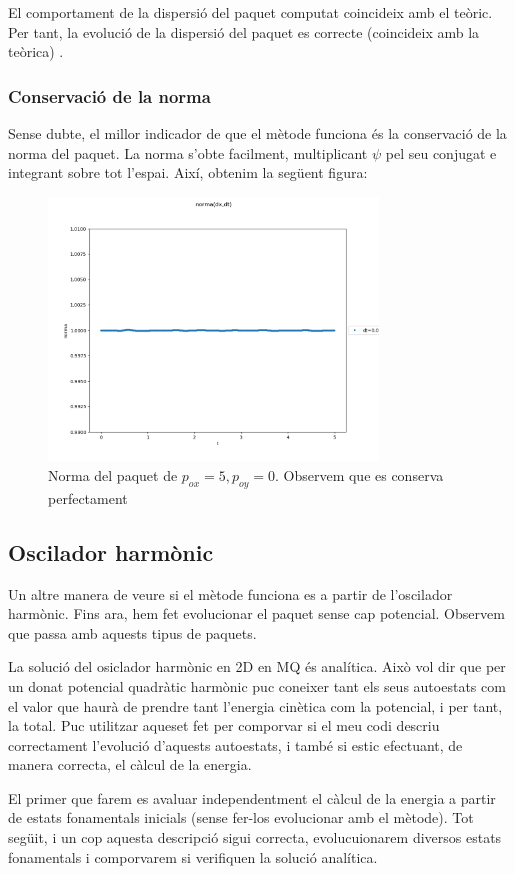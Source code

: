 \documentclass{article}
\begin{document}
El comportament de la dispersió del paquet computat coincideix amb el teòric. Per tant, la evolució de la dispersió del paquet es correcte (coincideix amb la teòrica) .

\subsubsection{Conservació de la norma}
Sense dubte, el millor indicador de que el mètode funciona és la conservació de la norma del paquet. La norma s'obte facilment, multiplicant \(\psi\)  pel seu conjugat e integrant sobre tot l'espai. Així, obtenim la següent figura:

\begin{figure}[H]
	\includegraphics[width=\textwidth,height=7cm]{normadiscretizatp05.png}
	\caption{Norma del paquet de \(p_{ox}=5,p_{oy}=0\). Observem que es conserva perfectament}
\end{figure}
\subsection{Oscilador harmònic}
Un altre manera de veure si el mètode funciona es a partir de l'oscilador harmònic. Fins ara, hem fet evolucionar el paquet sense cap potencial. Observem que passa amb aquests tipus de paquets.

La solució del osiclador harmònic en 2D en MQ és analítica. Això vol dir que per un donat potencial quadràtic harmònic puc coneixer tant els seus autoestats
com el valor que haurà de prendre tant l'energia cinètica com la potencial, i per tant, la total. Puc utilitzar aqueset fet per comporvar si el meu codi
descriu correctament l'evolució d'aquests autoestats, i també si estic efectuant, de manera correcta, el càlcul de la energia. 


El primer que farem es avaluar independentment el càlcul de la energia a partir de estats fonamentals inicials (sense fer-los evolucionar amb el mètode). Tot següit, i un cop aquesta descripció sigui correcta, evolucuionarem diversos estats fonamentals i comporvarem si verifiquen la solució
analítica.
\end{document}

